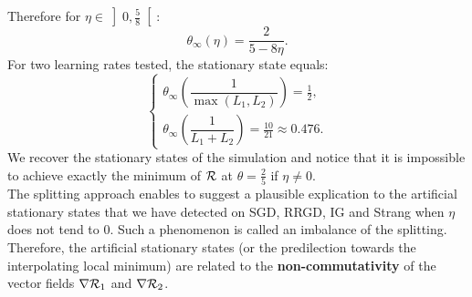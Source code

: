 Therefore for $\eta \in \left]0,\frac{5}{8}\right[$:
\begin{equation*}
	\theta_{\infty} (\eta)= \dfrac{2}{5-8\eta}.
\end{equation*}
For two learning rates tested, the stationary state equals:
\begin{equation*}
	\left\{
	\begin{array}{ll}
		\theta_{\infty}\left(\dfrac{1}{\max(L_1,L_2)}\right) = \frac{1}{2}, \\
		\theta_{\infty}\left(\dfrac{1}{L_1+L_2}\right) = \frac{10}{21}\approx 0.476.
	\end{array}
	\right.
\end{equation*}
We recover the stationary states of the simulation and notice that it is impossible to achieve exactly the minimum of $\mathcal{R}$ at $\theta=\frac{2}{5}$ if $\eta \neq 0$. \\
The splitting approach enables to suggest a plausible explication to the artificial stationary states that we have detected on SGD, RRGD, IG and Strang when $\eta$ does not tend to 0. Such a phenomenon is called an imbalance of the splitting. Therefore, the artificial stationary states (or the predilection towards the interpolating local minimum) are related to the \textbf{non-commutativity} of the vector fields $\nabla \mathcal{R}_1$ and $\nabla \mathcal{R}_2$. 

